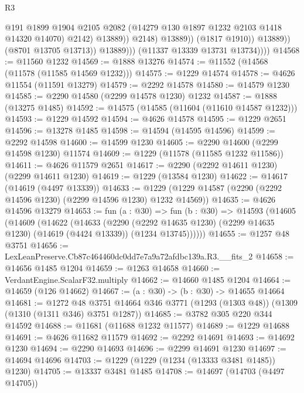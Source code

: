 \begin{lexlean}{R3}
\begin{coremodule}
                                    @191
                                    @1899
                                    @1904
                                    @2105
                                    @2082
                                    (@14279 @130 @1897 @1232 @2103 @1418 @14320 @14070)
                                    @2142)
                                  @13889))
                              @2148)
                            @13889))
                        (@1817 @1910))
                      @13889))
                  (@8701 @13705 @13713))
                @13889)))
          (@11337 @13339 @13731 @13734))))
@14568 := @11560 @1232
@14569 := @1888 @13276
@14574 := @11552 (@14568 (@11578 (@11585 @14569 @1232)))
@14575 := @1229 @14574
@14578 := @4626 @11554 (@11591 @13279)
@14579 := @2292 @14578
@14580 := @14579 @1230
@14585 := @2290 @14580 (@2299 @14578 @1230) @1232
@14587 := @1888 (@13275 @1485)
@14592 := @14575 (@14585 (@11604 (@11610 @14587 @1232)))
@14593 := @1229 @14592
@14594 := @4626 @14578
@14595 := @1229 @2651
@14596 := @13278 @1485
@14598 := @14594 (@14595 @14596)
@14599 := @2292 @14598
@14600 := @14599 @1230
@14605 := @2290 @14600 (@2299 @14598 @1230) @11574
@14609 := @1229 (@11578 (@11585 @1232 @11586))
@14611 := @4626 @11579 @2651
@14617 := @2290 (@2292 @14611 @1230) (@2299 @14611 @1230)
@14619 := @1229 (@13584 @1230)
@14622 := @14617 (@14619 (@4497 @13339))
@14633 := @1229 (@1229 @14587 (@2290 (@2292 @14596 @1230) (@2299 @14596 @1230) @1232 @14569))
@14635 := @4626 @14596 @13279
@14653 := fun (a : @30) =>
  fun (b : @30) =>
  @14593
    (@14605
      (@14609
        (@14622
          (@14633
            (@2290
              (@2292 @14635 @1230)
              (@2299 @14635 @1230)
              (@14619 (@4424 @13339))
              (@1234 @13745))))))
@14655 := @1257 @48 @3751
@14656 := LexLeanPreserve.Cb87c464460dc0dd7e7a9a72afdbc139a.R3.__fits_2
@14658 := @14656 @1485 @1204
@14659 := @1263 @14658
@14660 := VerdantEngine.ScalarF32.multiply
@14662 := @14660 @1485 @1204
@14664 := @14659 (@126 @14662)
@14667 := (a : @30) -> (b : @30) -> @14655 @14664
@14681 := @1272
    @48
    @3751
    @14664
    @346
    @3771
    (@1293 (@1303 @48))
    (@1309 (@1310 (@1311 @346) @3751 @1287))
@14685 := @3782 @305 @220 @344 @14592
@14688 := @11681 (@11688 @1232 @11577)
@14689 := @1229 @14688
@14691 := @4626 @11682 @11579
@14692 := @2292 @14691
@14693 := @14692 @1230
@14694 := @2290 @14693
@14696 := @2299 @14691 @1230
@14697 := @14694 @14696
@14703 := @1229 (@1229 (@1234 (@13333 @3481 @1485)) @1230)
@14705 := @13337 @3481 @1485
@14708 := @14697 (@14703 (@4497 @14705))

\end{coremodule}
\end{lexlean}
